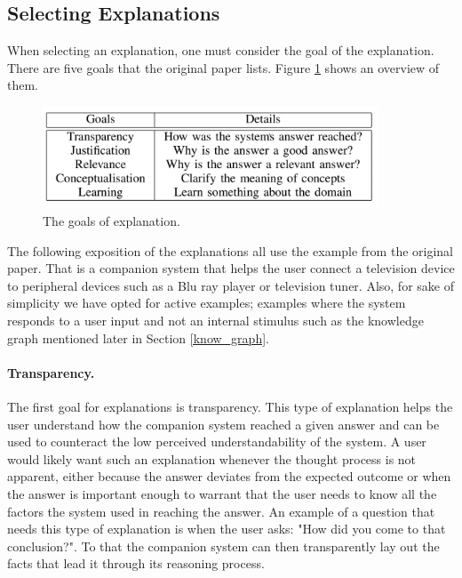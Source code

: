 \documentclass[a4paper]{article}
\begin{document}
\subsection{Selecting Explanations}

When selecting an explanation, one must consider the goal of the explanation. There are five goals that the original paper lists. Figure \ref{fig:goals} shows an overview of them.

\begin{figure}[H]
	\centering
	\includegraphics[width=10cm]{goals.png}
	\caption{The goals of explanation.}
	\label{fig:goals}
\end{figure}

The following exposition of the explanations all use the example from the original paper. That is a companion system that helps the user connect a television device to peripheral devices such as a Blu ray player or television tuner. Also, for sake of simplicity we have opted for active examples; examples where the system responds to a user input and not an internal stimulus such as the knowledge graph mentioned later in Section \ref{know_graph}.

\paragraph{Transparency.} The first goal for explanations is transparency. This type of explanation helps the user understand how the companion system reached a given answer and can be used to counteract the low perceived understandability of the system. A user would likely want such an explanation whenever the thought process is not apparent, either because the answer deviates from the expected outcome or when the answer is important enough to warrant that the user needs to know all the factors the system used in reaching the answer. An example of a question that needs this type of explanation is when the user asks: "How did you come to that conclusion?". To that the companion system can then transparently lay out the facts that lead it through its reasoning process.
\end{document}
